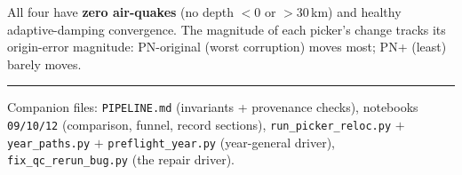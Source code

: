 \documentclass[11pt]{article}
\begin{document}
\noindent All four have \textbf{zero air-quakes} (no depth $<0$ or $>30$\,km) and healthy adaptive-damping
convergence. The magnitude of each picker's change tracks its origin-error magnitude: PN-original (worst
corruption) moves most; PN+ (least) barely moves.

\vspace{3mm}\hrule\vspace{2mm}
{\small\color{soft} Companion files: \texttt{PIPELINE.md} (invariants + provenance checks),
notebooks \texttt{09/10/12} (comparison, funnel, record sections),
\texttt{run\_picker\_reloc.py} $+$ \texttt{year\_paths.py} $+$ \texttt{preflight\_year.py} (year-general driver),
\texttt{fix\_qc\_rerun\_bug.py} (the repair driver).}
\end{document}
